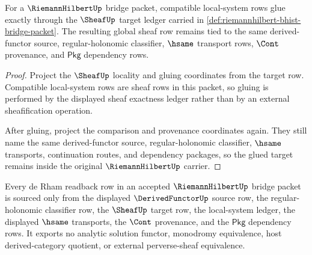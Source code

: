 \begin{theorem}
\label{thm:riemannhilbert-sheaf-gluing-exactness}
For a $\RiemannHilbertUp$ bridge packet, compatible local-system rows glue exactly through the $\SheafUp$ target ledger carried in \autoref{def:riemannhilbert-bhist-bridge-packet}. The resulting global sheaf row remains tied to the same derived-functor source, regular-holonomic classifier, $\hsame$ transport rows, $\Cont$ provenance, and $\mathsf{Pkg}$ dependency rows.
\end{theorem}
\begin{proof}
Project the $\SheafUp$ locality and gluing coordinates from the target row. Compatible local-system rows are sheaf rows in this packet, so gluing is performed by the displayed sheaf exactness ledger rather than by an external sheafification operation.

After gluing, project the comparison and provenance coordinates again. They still name the same derived-functor source, regular-holonomic classifier, $\hsame$ transports, continuation routes, and dependency packages, so the glued target remains inside the original $\RiemannHilbertUp$ carrier.
\end{proof}
\begin{theorem}
\label{thm:riemannhilbert-de-rham-readback-scope}
Every de Rham readback row in an accepted $\RiemannHilbertUp$ bridge packet is sourced only from the displayed $\DerivedFunctorUp$ source row, the regular-holonomic classifier row, the $\SheafUp$ target row, the local-system ledger, the displayed $\hsame$ transports, the $\Cont$ provenance, and the $\mathsf{Pkg}$ dependency rows. It exports no analytic solution functor, monodromy equivalence, host derived-category quotient, or external perverse-sheaf equivalence.
\end{theorem}
